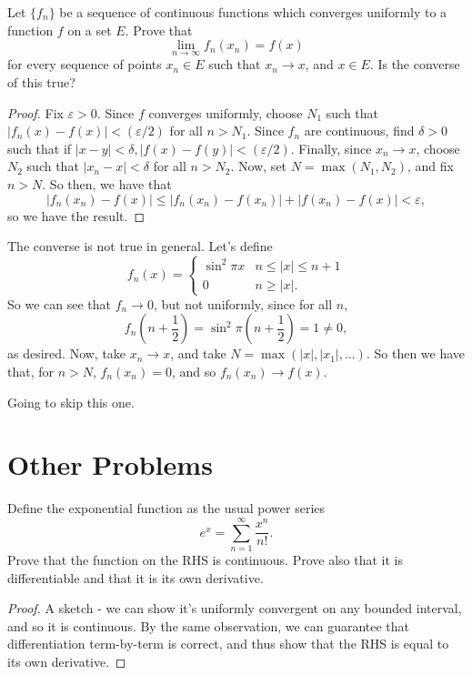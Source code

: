 \documentclass{assignment}
\begin{document}
\begin{question}[7.9*]
 Let $\{f_n\}$ be a sequence of continuous functions which converges uniformly to a function $f$ on
a set $E$. Prove that $$\lim_{n\to\infty}f_n(x_n) = f(x)$$ for every sequence of points $x_n \in E$
such that $x_n\to x$, and $x\in E$. Is the converse of this true? 
\end{question}
\begin{proof}
  Fix $\varepsilon > 0$. Since $f$ converges uniformly, choose $N_1$ such that $|f_n(x) - f(x)| <
(\varepsilon / 2)$ for all $n > N_1$. Since $f_n$ are continuous, find $\delta > 0$ such that if 
$|x - y| < \delta, |f(x) - f(y)| < (\varepsilon / 2)$. Finally, since $x_n\to x$, choose $N_2$ such 
that $|x_n - x| < \delta$ for all $n > N_2$. Now, set $N = \max(N_1, N_2)$, and fix $n > N$. So
then, we have that 
$$|f_n(x_n) - f(x)| \leq |f_n(x_n) - f(x_n)| + |f(x_n) - f(x)| < \varepsilon,$$
so we have the result.
\end{proof}
The converse is not true in general. Let's define 
$$f_n(x) = \begin{cases} \sin^2 \pi x &n \leq |x| \leq n + 1 \\ 0 &n \geq |x|. \end{cases}$$
So we can see that $f_n \to 0$, but not uniformly, since for all $n$, 
$$f_n\left(n + \frac{1}{2}\right) = \sin^2 \pi \left( n + \frac{1}{2} \right) = 1 \neq 0,$$
as desired. Now, take $x_n \to x$, and take $N = \max(|x|, |x_1|, \ldots)$. So then we have that,
for $n > N$, $f_n(x_n) = 0$, and so $f_n(x_n) \to f(x)$.

\begin{question}[7.14*]
 Going to skip this one. 
\end{question}

\section*{Other Problems}
\begin{question}[1]
  Define the exponential function as the usual power series
$$e^x = \sum_{n=1}^\infty \frac{x^n}{n!}.$$
Prove that the function on the RHS is continuous. Prove also that it is differentiable and that it
is its own derivative.
\end{question}
\begin{proof}
  A sketch - we can show it's uniformly convergent on any bounded interval, and so it is continuous.
By the same observation, we can guarantee that differentiation term-by-term is correct, and thus
show that the RHS is equal to its own derivative.
\end{proof}
\end{document}
